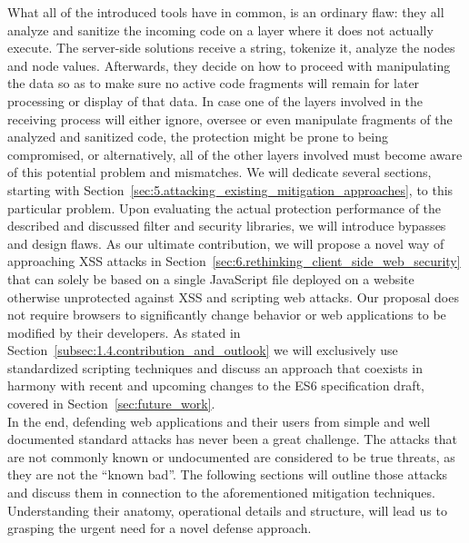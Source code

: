   What all of the introduced tools have in common, is an ordinary flaw: they all analyze and sanitize the incoming code on a layer where it does not actually execute. The server-side solutions receive a string, tokenize it, analyze the nodes and node values. Afterwards, they decide on how to proceed with manipulating the data so as to make sure no active code fragments will remain for later processing or display of that data. In case one of the layers involved in the receiving process will either ignore, oversee or even manipulate fragments of the analyzed and sanitized code, the protection might be prone to being compromised, or alternatively, all of the other layers involved must become aware of this potential problem and mismatches. We will dedicate several sections, starting with Section~\ref{sec:5.attacking_existing_mitigation_approaches}, to this particular problem. Upon evaluating the actual protection performance of the described and discussed filter and security libraries, we will introduce bypasses 
and design flaws. As our ultimate contribution, we will propose a novel way of approaching XSS attacks in Section~\ref{sec:6.rethinking_client_side_web_security} that can solely be based on a single JavaScript file deployed on a website otherwise unprotected against XSS and scripting web attacks. Our proposal does not require browsers to significantly change behavior or web applications to be modified by their developers. As stated in Section~\ref{subsec:1.4.contribution_and_outlook} we will exclusively use standardized scripting techniques and discuss an approach that coexists in harmony with recent and upcoming changes to the ES6 specification draft, covered in Section~\ref{sec:future_work}.\\

  In the end, defending web applications and their users from simple and well documented standard attacks has never been a great challenge. 
  The attacks that are not commonly known or undocumented are considered to be true threats, as they are not the ``known bad''. The following sections will outline those attacks and discuss them in connection to the aforementioned mitigation techniques. Understanding their anatomy, operational details and structure, will lead us to grasping the urgent need for a novel defense approach.  

\pagebreak